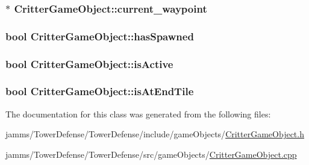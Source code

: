 \hypertarget{class_critter_game_object_a1c661287931e114c68e7cd16a1bf5d47}{
\subsubsection[{current\+\_\+waypoint}]{$\ast$ Critter\+Game\+Object\+::current\+\_\+waypoint\hspace{0.3cm}{\ttfamily [protected]}}}\label{class_critter_game_object_a1c661287931e114c68e7cd16a1bf5d47}
\hypertarget{class_critter_game_object_ad703baff6e0d35129dadc48172c26353}{
\subsubsection[{has\+Spawned}]{\setlength{\rightskip}{0pt plus 5cm}bool Critter\+Game\+Object\+::has\+Spawned}}\label{class_critter_game_object_ad703baff6e0d35129dadc48172c26353}
\hypertarget{class_critter_game_object_a9e8edd5ea266b18433e9b9f0f3184b97}{
\subsubsection[{is\+Active}]{\setlength{\rightskip}{0pt plus 5cm}bool Critter\+Game\+Object\+::is\+Active}}\label{class_critter_game_object_a9e8edd5ea266b18433e9b9f0f3184b97}
\hypertarget{class_critter_game_object_a21c4863faaf8fc2c0314575c07764ce4}{
\subsubsection[{is\+At\+End\+Tile}]{\setlength{\rightskip}{0pt plus 5cm}bool Critter\+Game\+Object\+::is\+At\+End\+Tile}}\label{class_critter_game_object_a21c4863faaf8fc2c0314575c07764ce4}


The documentation for this class was generated from the following files\+:\begin{DoxyCompactItemize}
\item 
jamms/\+Tower\+Defense/\+Tower\+Defense/include/game\+Objects/\hyperlink{_critter_game_object_8h}{Critter\+Game\+Object.\+h}\item 
jamms/\+Tower\+Defense/\+Tower\+Defense/src/game\+Objects/\hyperlink{_critter_game_object_8cpp}{Critter\+Game\+Object.\+cpp}\end{DoxyCompactItemize}
